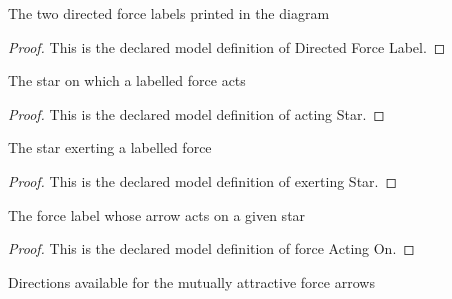 \begin{definition}
  \label{def:physics:phyx-mini-0716:phyxminiproblems-problemphyxmini0716-directedforcelabel}
  The two directed force labels printed in the diagram
\end{definition}
\begin{proof}
  This is the declared model definition of Directed Force Label.
\end{proof}
\begin{definition}
  \label{def:physics:phyx-mini-0716:phyxminiproblems-problemphyxmini0716-directedforcelabel-actingstar}
  The star on which a labelled force acts
\end{definition}
\begin{proof}
  This is the declared model definition of acting Star.
\end{proof}
\begin{definition}
  \label{def:physics:phyx-mini-0716:phyxminiproblems-problemphyxmini0716-directedforcelabel-exertingstar}
  The star exerting a labelled force
\end{definition}
\begin{proof}
  This is the declared model definition of exerting Star.
\end{proof}
\begin{definition}
  \label{def:physics:phyx-mini-0716:phyxminiproblems-problemphyxmini0716-forceactingon}
  The force label whose arrow acts on a given star
\end{definition}
\begin{proof}
  This is the declared model definition of force Acting On.
\end{proof}
\begin{definition}
  \label{def:physics:phyx-mini-0716:phyxminiproblems-problemphyxmini0716-forcearrowdirection}
  Directions available for the mutually attractive force arrows
\end{definition}
